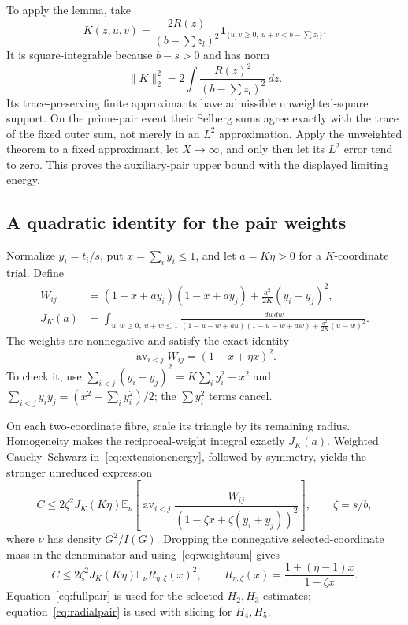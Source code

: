 \documentclass[11pt,a4paper]{article}
\theoremstyle{definition}\newtheorem{definition}[theorem]{Definition}
\theoremstyle{remark}\newtheorem{remark}[theorem]{Remark}
\newcommand{\E}{\mathbb E}\newcommand{\Prob}{\mathbb P}
\newcommand{\ind}{\mathbf 1}\newcommand{\dd}{\,d}
\newcommand{\av}{\operatorname{av}}
\numberwithin{equation}{section}
\begin{document}
To apply the lemma, take
\[
 K(z,u,v)=\frac{2R(z)}{(b-\sum z_l)^2}
 \ind_{\{u,v\ge0,\ u+v<b-\sum z_l\}}.
\]
It is square-integrable because $b-s>0$ and has norm
\[
 \|K\|_2^2=2\int\frac{R(z)^2}{(b-\sum z_l)^2}\dd z.
\]
Its trace-preserving finite approximants have admissible unweighted-square support. On the prime-pair event their Selberg sums agree exactly with the trace of the fixed outer sum, not merely in an $L^2$ approximation. Apply the unweighted theorem to a fixed approximant, let $X\to\infty$, and only then let its $L^2$ error tend to zero. This proves the auxiliary-pair upper bound with the displayed limiting energy.

\subsection{A quadratic identity for the pair weights}
Normalize $y_i=t_i/s$, put $x=\sum_i y_i\le1$, and let $a=K\eta>0$ for a $K$-coordinate trial. Define
\begin{align}
 W_{ij}&=(1-x+ay_i)(1-x+ay_j)+\frac{a^2}{2K}(y_i-y_j)^2,\label{eq:weights}\\
 J_K(a)&=\int_{u,w\ge0,\ u+w\le1}
 \frac{\dd u\dd w}
 {(1-u-w+au)(1-u-w+aw)+\frac{a^2}{2K}(u-w)^2}.\label{eq:J}
\end{align}
The weights are nonnegative and satisfy the exact identity
\begin{equation}\label{eq:weightsum}
 \av_{i<j}W_{ij}=(1-x+\eta x)^2.
\end{equation}
To check it, use $\sum_{i<j}(y_i-y_j)^2=K\sum_i y_i^2-x^2$ and $\sum_{i<j}y_iy_j=(x^2-\sum_i y_i^2)/2$; the $\sum y_i^2$ terms cancel.

On each two-coordinate fibre, scale its triangle by its remaining radius. Homogeneity makes the reciprocal-weight integral exactly $J_K(a)$. Weighted Cauchy--Schwarz in~\eqref{eq:extensionenergy}, followed by symmetry, yields the stronger unreduced expression
\begin{equation}\label{eq:fullpair}
 C\le2\zeta^2J_K(K\eta)
 \E_\nu\left[\av_{i<j}
 \frac{W_{ij}}{(1-\zeta x+\zeta(y_i+y_j))^2}\right],
 \qquad \zeta=s/b,
\end{equation}
where $\nu$ has density $G^2/I(G)$.
Dropping the nonnegative selected-coordinate mass in the denominator and using~\eqref{eq:weightsum} gives
\begin{equation}\label{eq:radialpair}
 C\le2\zeta^2J_K(K\eta)\E_\nu R_{\eta,\zeta}(x)^2,
 \qquad R_{\eta,\zeta}(x)=\frac{1+(\eta-1)x}{1-\zeta x}.
\end{equation}
Equation~\eqref{eq:fullpair} is used for the selected $H_2,H_3$ estimates; equation~\eqref{eq:radialpair} is used with slicing for $H_4,H_5$.
\end{document}
